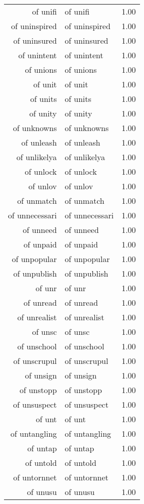 \begin{table}[ht]
\begin{tabular}{rlr}
  of unifi & of unifi & 1.00 \\ 
  of uninspired & of uninspired & 1.00 \\ 
  of uninsured & of uninsured & 1.00 \\ 
  of unintent & of unintent & 1.00 \\ 
  of unions & of unions & 1.00 \\ 
  of unit & of unit & 1.00 \\ 
  of units & of units & 1.00 \\ 
  of unity & of unity & 1.00 \\ 
  of unknowns & of unknowns & 1.00 \\ 
  of unleash & of unleash & 1.00 \\ 
  of unlikelya & of unlikelya & 1.00 \\ 
  of unlock & of unlock & 1.00 \\ 
  of unlov & of unlov & 1.00 \\ 
  of unmatch & of unmatch & 1.00 \\ 
  of unnecessari & of unnecessari & 1.00 \\ 
  of unneed & of unneed & 1.00 \\ 
  of unpaid & of unpaid & 1.00 \\ 
  of unpopular & of unpopular & 1.00 \\ 
  of unpublish & of unpublish & 1.00 \\ 
  of unr & of unr & 1.00 \\ 
  of unread & of unread & 1.00 \\ 
  of unrealist & of unrealist & 1.00 \\ 
  of unsc & of unsc & 1.00 \\ 
  of unschool & of unschool & 1.00 \\ 
  of unscrupul & of unscrupul & 1.00 \\ 
  of unsign & of unsign & 1.00 \\ 
  of unstopp & of unstopp & 1.00 \\ 
  of unsuspect & of unsuspect & 1.00 \\ 
  of unt & of unt & 1.00 \\ 
  of untangling & of untangling & 1.00 \\ 
  of untap & of untap & 1.00 \\ 
  of untold & of untold & 1.00 \\ 
  of untornnet & of untornnet & 1.00 \\ 
  of unusu & of unusu & 1.00 \\ 

\end{tabular}
\end{table}
